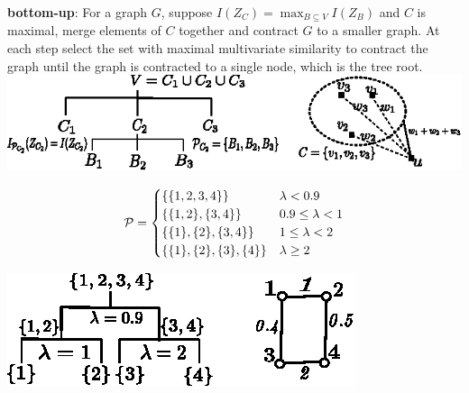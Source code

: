 \documentclass[portrait,final,a0paper,fontscale=0.3]{baposter}
\begin{document}
\begin{poster}
{\textbf{bottom-up}: For a graph $G$, suppose $I(Z_C) = \max_{B\subseteq V} I(Z_B)$ and $C$ is maximal, merge elements of $C$ together and contract $G$ to a smaller graph. At each step select the set with maximal multivariate similarity to contract the graph until the graph is contracted to a single node, which is the tree root. \\

\includegraphics[width=0.9\linewidth]{img/two_approach.eps}

\begin{equation*}
	\P = 
	\begin{cases}
		\{\{1,2,3,4\}\} & \lambda < 0.9 \\
		\{\{1,2\},\{3,4\}\} & 0.9 \leq \lambda < 1 \\
		\{\{1\},\{2\},\{3,4\}\} & 1 \leq \lambda < 2\\
		\{\{1\},\{2\},\{3\},\{4\}\} & \lambda \geq 2
	\end{cases}
\end{equation*}

\includegraphics[width=0.77\linewidth]{img/threshold.eps}
}

\end{poster}
\end{document}
